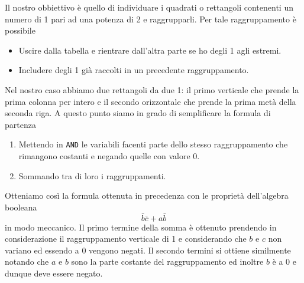 Il nostro obbiettivo è quello di individuare i quadrati o rettangoli contenenti un numero di 1 pari
ad una potenza di 2 e raggrupparli. Per tale raggruppamento è possibile
\begin{itemize}
	\item Uscire dalla tabella e rientrare dall'altra parte se ho degli 1 agli estremi.
	\item Includere degli 1 già raccolti in un precedente raggruppamento.
\end{itemize}
Nel nostro caso abbiamo due rettangoli da due 1: il primo verticale che prende la prima colonna per
intero e il secondo orizzontale che prende la prima metà della seconda riga. A questo punto siamo
in grado di semplificare la formula di partenza
\begin{enumerate}
	\item Mettendo in \verb|AND| le variabili facenti parte dello stesso raggruppamento che
	      rimangono costanti e negando quelle con valore 0.
	\item Sommando tra di loro i raggruppamenti.
\end{enumerate}
Otteniamo così la formula ottenuta in precedenza con le proprietà dell'algebra booleana
\[ \bar{b} \bar{c} + a \bar{b} \]
in modo meccanico. Il primo termine della somma è ottenuto prendendo in considerazione il
raggruppamento verticale di 1 e considerando che $b$ e $c$ non variano ed essendo a 0 vengono
negati. Il secondo termini si ottiene similmente notando che $a$ e $b$ sono la parte costante del
raggruppamento ed inoltre $b$ è a 0 e dunque deve essere negato.


